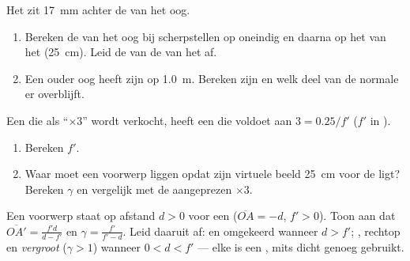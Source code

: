 \begin{exercise}[$\star\star\star$]\label{exo:g11:lenses-and-eye:13}
Het  zit \qty{17}{mm} achter de  van het oog.
\begin{enumerate}
  \item Bereken de  van het oog bij scherpstellen op oneindig
        en daarna op het  van het  (\qty{25}{cm}).
        Leid de  van de  van het  af.
  \item Een ouder oog heeft zijn  op \qty{1.0}{m}. Bereken zijn
         en welk deel van de normale  er overblijft.
\end{enumerate}
\end{exercise}

\begin{exercise}[$\star\star\star$]\label{exo:g11:lenses-and-eye:14}
Een  die als ``$\times 3$'' wordt verkocht, heeft een
 die voldoet aan $3 = 0.25/f'$ ($f'$ in ).
\begin{enumerate}
  \item Bereken $f'$.
  \item Waar moet een voorwerp liggen opdat zijn virtuele beeld
        \qty{25}{cm} voor de  ligt? Bereken $\gamma$ en vergelijk met
        de aangeprezen $\times 3$.
\end{enumerate}
\end{exercise}

\begin{exercise}[$\star\star\star$]\label{exo:g11:lenses-and-eye:15}
Een  voorwerp staat op afstand $d > 0$ voor een 
($\overline{OA} = -d$, $f' > 0$). Toon aan dat
$\overline{OA'} = \frac{f'd}{d - f'}$ en $\gamma = \frac{f'}{f' - d}$.
Leid daaruit af:  en omgekeerd wanneer $d > f'$; , rechtop
en \emph{vergroot} ($\gamma > 1$) wanneer $0 < d < f'$ --- elke
 is een , mits dicht genoeg gebruikt.
\end{exercise}

